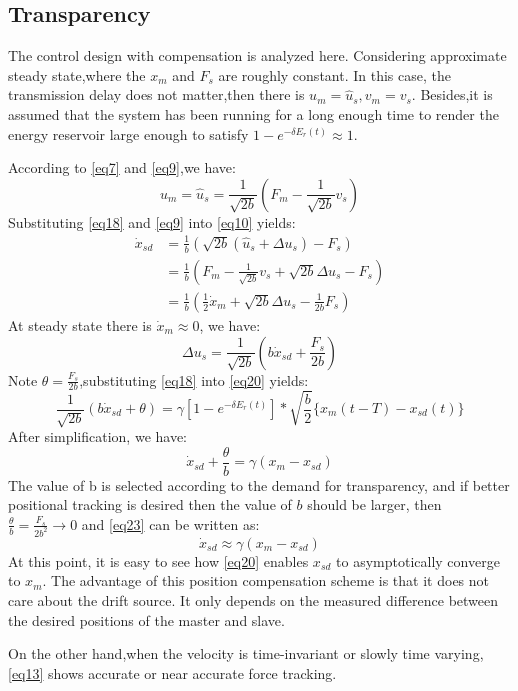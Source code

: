 \subsection{Transparency}
The control design with compensation is analyzed here.
Considering approximate steady state,where the $x_m$ and $F_s$ are roughly constant.
In this case, the transmission delay does not matter,then there is ${{u}_{m}}={{\hat{u}}_{s}},{{v}_{m}}={{v}_{s}}$.
Besides,it is assumed that the system has been running for a long enough time
to render the energy reservoir large enough to satisfy $1-{{e}^{-\delta {{E}_{r}}(t)}}\approx 1$.
\par According to \eqref{eq7} and \eqref{eq9},we have:
\begin{equation}
    {{u}_{m}}={{\hat{u}}_{s}}=\frac{1}{\sqrt{2b}}
    \left( {{F}_{m}}-\frac{1}{\sqrt{2b}}{{v}_{s}} \right)
    \label{eq21}
\end{equation}
Substituting \eqref{eq18} and \eqref{eq9} into \eqref{eq10} yields:
$$\begin{aligned}
        \dot{x}_{sd} & =\frac{1}{b}(\sqrt{2b}(\hat{u}_{s}+\Delta u_{s})-F_{s})                      \\
                     & =\frac{1}{b}(F_{m}-\frac{1}{\sqrt{2b}}v_{s}+\sqrt{2b}\Delta u_{s}-F_{s})     \\
                     & =\frac{1}{b}(\frac{1}{2}\dot{x}_{m}+\sqrt{2b}\Delta u_{s}-\frac{1}{2b}F_{s})
    \end{aligned}$$
At steady state there is $\dot x_m \approx 0$, we have:
\begin{equation}
    \Delta {{u}_{s}}=\frac{1}{\sqrt{2b}}(b{{\dot{x}}_{sd}}+\frac{{{F}_{s}}}{2b})
    \label{eq22}
\end{equation}
Note $\theta = \frac{{{F}_{s}}}{2b}$,substituting \eqref{eq18} into \eqref{eq20} yields:
$$\frac{1}{\sqrt{2b}}(b{{\dot{x}}_{sd}}+\theta )=\gamma
    \left[ 1-{{e}^{-\delta {{E}_{r}}(t)}} \right]*\sqrt{\frac{b}{2}}\{{{x}_{m}}(t-T)-{{x}_{sd}}(t)\}$$
After simplification, we have:
\begin{equation}
    {{\dot{x}}_{sd}}+\frac{\theta }{b}=\gamma \left( {{x}_{m}}-{{x}_{sd}} \right)
    \label{eq23}
\end{equation}
The value of b is selected according to the demand for transparency,
and if better positional tracking is desired then the value of $b$ should be larger,
then $\frac{\theta }{b}=\frac{{{F}_{s}}}{2{{b}^{2}}}\to 0$ and \eqref{eq23} can be written as:
\begin{equation}
    {{\dot{x}}_{sd}}\approx \gamma \left( {{x}_{m}}-{{x}_{sd}} \right)
    \label{eq24}
\end{equation}
At this point,
it is easy to see how \eqref{eq20} enables $x_{sd}$ to asymptotically converge to $x_m$.
The advantage of this position compensation scheme is that it does not care about the drift source.
It only depends on the measured difference between the desired positions of the master and slave.
\par On the other hand,when the velocity is time-invariant or slowly time varying,
\eqref{eq13} shows accurate or near accurate force tracking.

